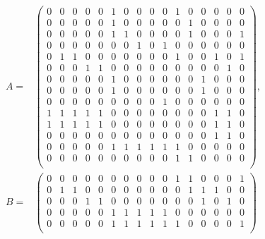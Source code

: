 \begin{frame}
    \tiny
    \begin{equation*}
        \begin{split}
        A = &\begin{pmatrix}
            0 & 0 & 0 & 0 & 0 & 1 & 0 & 0 & 0 & 0 & 1 & 0 & 0 & 0 & 0 & 0 \\
            0 & 0 & 0 & 0 & 0 & 1 & 0 & 0 & 0 & 0 & 0 & 1 & 0 & 0 & 0 & 0 \\
            0 & 0 & 0 & 0 & 0 & 1 & 1 & 0 & 0 & 0 & 0 & 1 & 0 & 0 & 0 & 1 \\
            0 & 0 & 0 & 0 & 0 & 0 & 0 & 1 & 0 & 1 & 0 & 0 & 0 & 0 & 0 & 0 \\
            0 & 1 & 1 & 0 & 0 & 0 & 0 & 0 & 0 & 0 & 1 & 0 & 0 & 1 & 0 & 1 \\
            0 & 0 & 0 & 1 & 1 & 0 & 0 & 0 & 0 & 0 & 0 & 0 & 0 & 0 & 1 & 0 \\
            0 & 0 & 0 & 0 & 0 & 1 & 0 & 0 & 0 & 0 & 0 & 0 & 1 & 0 & 0 & 0 \\
            0 & 0 & 0 & 0 & 0 & 1 & 0 & 0 & 0 & 0 & 0 & 0 & 1 & 0 & 0 & 0 \\
            0 & 0 & 0 & 0 & 0 & 0 & 0 & 0 & 0 & 1 & 0 & 0 & 0 & 0 & 0 & 0 \\
            1 & 1 & 1 & 1 & 1 & 0 & 0 & 0 & 0 & 0 & 0 & 0 & 0 & 1 & 1 & 0 \\
            1 & 1 & 1 & 1 & 1 & 0 & 0 & 0 & 0 & 0 & 0 & 0 & 0 & 1 & 1 & 0 \\
            0 & 0 & 0 & 0 & 0 & 0 & 0 & 0 & 0 & 0 & 0 & 0 & 0 & 1 & 1 & 0 \\
            0 & 0 & 0 & 0 & 0 & 1 & 1 & 1 & 1 & 1 & 1 & 0 & 0 & 0 & 0 & 0 \\
            0 & 0 & 0 & 0 & 0 & 0 & 0 & 0 & 0 & 0 & 1 & 1 & 0 & 0 & 0 & 0 \\
        \end{pmatrix},{}\\
        B = &\begin{pmatrix}
            0 & 0 & 0 & 0 & 0 & 0 & 0 & 0 & 0 & 0 & 1 & 1 & 0 & 0 & 0 & 1 \\
            0 & 1 & 1 & 0 & 0 & 0 & 0 & 0 & 0 & 0 & 0 & 1 & 1 & 1 & 0 & 0 \\
            0 & 0 & 0 & 1 & 1 & 0 & 0 & 0 & 0 & 0 & 0 & 0 & 1 & 0 & 1 & 0 \\
            0 & 0 & 0 & 0 & 0 & 1 & 1 & 1 & 1 & 1 & 0 & 0 & 0 & 0 & 0 & 0 \\
            0 & 0 & 0 & 0 & 0 & 1 & 1 & 1 & 1 & 1 & 1 & 0 & 0 & 0 & 0 & 1 \\

\end{pmatrix}
\end{split}
\end{equation*}
\end{frame}

